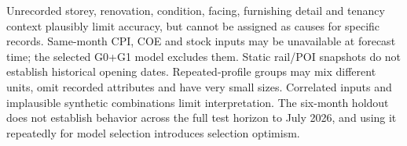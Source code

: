 Unrecorded storey, renovation, condition, facing, furnishing detail and tenancy context plausibly limit accuracy, but cannot be assigned as causes for specific records. Same-month CPI, COE and stock inputs may be unavailable at forecast time; the selected G0+G1 model excludes them. Static rail/POI snapshots do not establish historical opening dates. Repeated-profile groups may mix different units, omit recorded attributes and have very small sizes. Correlated inputs and implausible synthetic combinations limit interpretation. The six-month holdout does not establish behavior across the full test horizon to July 2026, and using it repeatedly for model selection introduces selection optimism.
